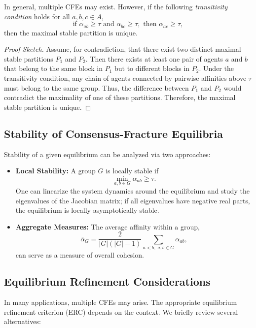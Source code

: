 \documentclass{article}
\begin{document}
\begin{theorem}
In general, multiple CFEs may exist. However, if the following \emph{transitivity condition} holds for all $a,b,c \in A$,
\[
\text{if } \alpha_{ab}\ge \tau \text{ and } \alpha_{bc}\ge \tau,\text{ then } \alpha_{ac}\ge \tau,
\]
then the maximal stable partition is unique.
\end{theorem}

\begin{proof}[Proof Sketch]
Assume, for contradiction, that there exist two distinct maximal stable partitions $P_1$ and $P_2$. Then there exists at least one pair of agents $a$ and $b$ that belong to the same block in $P_1$ but to different blocks in $P_2$. Under the transitivity condition, any chain of agents connected by pairwise affinities above $\tau$ must belong to the same group. Thus, the difference between $P_1$ and $P_2$ would contradict the maximality of one of these partitions. Therefore, the maximal stable partition is unique.
\end{proof}

\subsection{Stability of Consensus-Fracture Equilibria}
Stability of a given equilibrium can be analyzed via two approaches:
\begin{itemize}
  \item \textbf{Local Stability:} A group $G$ is locally stable if
    \[
    \min_{a,b\in G} \alpha_{ab} \ge \tau.
    \]
    One can linearize the system dynamics around the equilibrium and study the eigenvalues of the Jacobian matrix; if all eigenvalues have negative real parts, the equilibrium is locally asymptotically stable.
    
  \item \textbf{Aggregate Measures:} The average affinity within a group,
    \[
    \bar{\alpha}_G = \frac{2}{|G|(|G|-1)} \sum_{a<b,\;a,b\in G} \alpha_{ab},
    \]
    can serve as a measure of overall cohesion.
\end{itemize}

\subsection{Equilibrium Refinement Considerations}
In many applications, multiple CFEs may arise. The appropriate equilibrium refinement criterion (ERC) depends on the context. We briefly review several alternatives:
\end{document}
